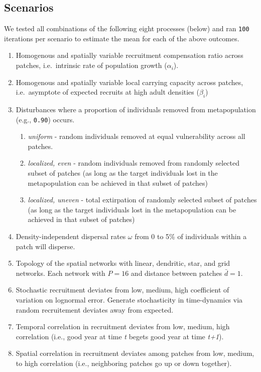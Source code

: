 \documentclass[
]{article}
\providecommand{\tightlist}{%
  \setlength{\itemsep}{0pt}\setlength{\parskip}{0pt}}
\begin{document}
\hypertarget{scenarios}{%
\subsection{Scenarios}\label{scenarios}}

We tested all combinations of the following eight processes (below) and
ran \texttt{100} iterations per scenario to estimate the mean for each
of the above outcomes.

\begin{enumerate}
\def\labelenumi{\arabic{enumi}.}
\item
  Homogenous and spatially variable recruitment compensation ratio
  across patches, i.e.~intrinsic rate of population growth
  (\(\alpha_i\)).
\item
  Homogenous and spatially variable local carrying capacity across
  patches, i.e.~asymptote of expected recruits at high adult densities
  (\(\beta_i\))
\item
  Disturbances where a proportion of individuals removed from
  metapopulation (e.g., \texttt{0.90}) occurs.

  \begin{enumerate}
  \def\labelenumii{\alph{enumii}.}
  \tightlist
  \item
    \emph{uniform} - random individuals removed at equal vulnerability
    across all patches.
  \item
    \emph{localized, even} - random individuals removed from randomly
    selected subset of patches (as long as the target individuals lost
    in the metapopulation can be achieved in that subset of patches)
  \item
    \emph{localized, uneven} - total extirpation of randomly selected
    subset of patches (as long as the target individuals lost in the
    metapopulation can be achieved in that subset of patches)
  \end{enumerate}
\item
  Density-independent dispersal rates \(\omega\) from 0 to 5\% of
  individuals within a patch will disperse.
\item
  Topology of the spatial networks with linear, dendritic, star, and
  grid networks. Each network with \(P=16\) and distance between patches
  \(\bar{d}=1\).
\item
  Stochastic recruitment deviates from low, medium, high coefficient of
  variation on lognormal error. Generate stochasticity in time-dynamics
  via random recruitement deviates away from expected.
\item
  Temporal correlation in recruitment deviates from low, medium, high
  correlation (i.e., good year at time \emph{t} begets good year at time
  \emph{t+1}).
\item
  Spatial correlation in recruitment deviates among patches from low,
  medium, to high correlation (i.e., neighboring patches go up or down
  together).
\end{enumerate}
\end{document}
